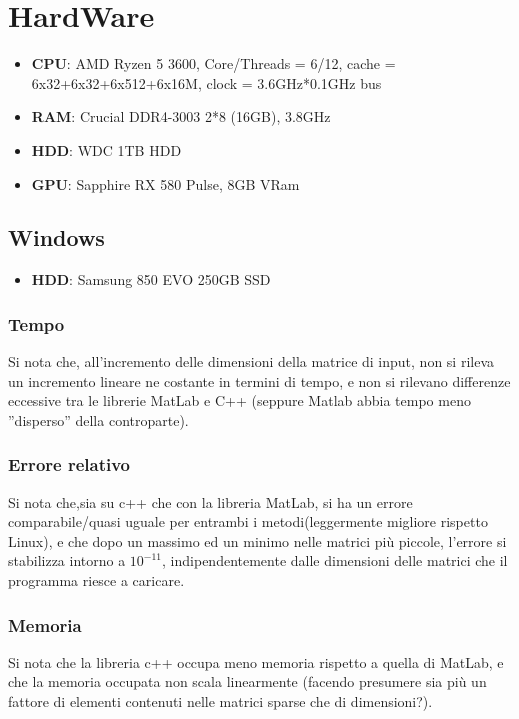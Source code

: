 \documentclass[12pt]{article}
\begin{document}
	
\section{HardWare}	
	\begin{itemize}
		\item \textbf{CPU}: AMD Ryzen 5 3600, Core/Threads = 6/12, cache = 6x32+6x32+6x512+6x16M, clock = 3.6GHz*0.1GHz bus
		\item \textbf{RAM}: Crucial DDR4-3003 2*8 (16GB), 3.8GHz
		\item \textbf{HDD}: WDC 1TB HDD
		\item \textbf{GPU}: Sapphire RX 580 Pulse, 8GB VRam
	\end{itemize}
	\subsection{Windows}
	\begin{itemize}
		\item \textbf{HDD}: Samsung 850 EVO 250GB SSD
	\end{itemize}
		\subsubsection{Tempo}
			Si nota che, all'incremento delle dimensioni della matrice di input, non si rileva un incremento lineare ne costante in termini di tempo, e non si rilevano differenze eccessive tra le librerie MatLab e C++ (seppure Matlab abbia tempo meno ''disperso'' della controparte).
		\begin{figure}[h!]
			 \centering
  			
 		\end{figure}
		\subsubsection{Errore relativo}
		Si nota che,sia su c++ che con la libreria MatLab, si ha un errore comparabile/quasi uguale per entrambi i metodi(leggermente migliore rispetto Linux),  e che dopo un massimo ed un minimo nelle matrici più piccole, l'errore si stabilizza intorno a $10^{-11}$, indipendentemente dalle dimensioni delle matrici che il programma riesce a caricare.
		\begin{figure}[h!]
			 \centering
 		\end{figure}
		\subsubsection{Memoria}
				Si nota che la libreria c++ occupa meno memoria rispetto a quella di MatLab, e che la memoria occupata non scala linearmente (facendo presumere sia più un fattore di elementi contenuti nelle matrici sparse che di dimensioni?).
		\begin{figure}[h!]
			 \centering
 		\end{figure}
\end{document}
